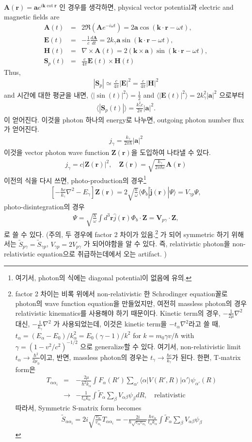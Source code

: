 \documentclass[11pt]{book}
\def\bm{\boldsymbol}
\def\vk{{\bm k}}
\def\vr{{\bm r}}
\def\la{\langle}
\def\ra{\rangle}
\newcommand{\bea}{\begin{eqnarray}}
\newcommand{\eea}{\end{eqnarray}}
\newcommand{\no}{\nonumber \\}
\begin{document}
${\bm A}(\vr)={\bm a}e^{i\vk\cot\vr}$ 인 경우를 생각하면, physical vector potential과 
electric and magnetic fields are
\bea 
{\bm A}(t)&=& 2\Re({\bm A}e^{-i\omega t})= 2{\bm a}\cos(\vk\cdot\vr-\omega t) ,\no 
{\bm E}(t)&=& -\frac{1}{c}\frac{d{\bm A}}{dt}
             = 2 k_\gamma {\bm a}\sin(\vk\cdot\vr-\omega t),\no 
{\bm H}(t)&=&\nabla\times{\bm A}(t)= 2(\vk\times{\bm a}) \sin(\vk\cdot\vr-\omega t),\no 
{\bm S}_p(t) &=& \frac{c}{4\pi}{\bm E}(t)\times{\bm H}(t)              
\eea 
Thus,
\bea 
|{\bm S}_p|\simeq \frac{c}{4\pi}|{\bm E}|^2=\frac{c}{4\pi}|{\bm H}|^2
\eea 
and 시간에 대한 평균을 내면,
$\la |\sin(t)|^2\ra =\frac{1}{2}$ and $\la |{\bm E}(t)|^2\ra = 2 k_\gamma^2 |{\bm a}|^2$
으로부터
\bea 
\la |{\bm S}_p(t)|\ra =\frac{k_\gamma^2 c}{2\pi}|{\bm a}|^2.
\eea 
이 얻어진다. 이것을 photon 하나의 energy로 나누면, outgoing photon number flux 가 얻어진다.
\bea 
j_\gamma =\frac{k_\gamma}{2\pi\hbar} |{\bm a}|^2
\eea 
이것을 vector photon wave function ${\bm Z}(\vr)$을 도입하여 나타낼 수 있다.
\bea 
j_\gamma = c|{\bm Z}(\vr)|^2,\quad {\bm Z}(\vr)=\sqrt{\frac{k_\gamma}{2\pi\hbar c}}{\bm A}(\vr)
\eea 
이전의 식을 다시 쓰면, photo-production의 경우\footnote{여기서,
photon의 식에는 diagonal potential이 없음에 유의. } 
\bea 
\left[-\frac{\hbar c}{k_\gamma}\nabla^2-E_\gamma\right]{\bm Z}(\vr)
 =2\sqrt{\frac{h}{\omega}}\la \Phi_b|\hat{\bm j}(\vr)|\Psi\ra
 =V_{\gamma p}\Psi ,  
\eea 
photo-disintegration의 경우
\bea 
[\hat{T}-V-E]\Psi= \sqrt{\frac{h}{\omega}}\int d^3\vr \hat{j}(\vr)\Phi_b\cdot {\bm Z}
      ={\bm V}_{p\gamma}\cdot {\bm Z},
\eea 
로 쓸 수 있다. (주의, 두 경우에 factor 2 차이가 있음.\footnote{
factor 2 차이는 비록 위에서 non-relativistic 한 Schrodinger equation꼴로 photon의 wave function equation을 만들었지만, 여전히 massless photon의 경우 relativistic kinematics를 사용해야 하기 때문이다. 
Kinetic term의 경우, $-\frac{1}{2\mu}\nabla^2$ 대신, $-\frac{1}{k_\gamma}\nabla^2$ 가 사용되었는데,
이것은 kinetic term을 $-t_\alpha\nabla^2$라고 쓸 때, 
$t_\alpha=(E_\alpha-E_0)/k_\alpha^2=E_0(\gamma-1)/k^2$ for $k=m_0\gamma v/\hbar $
with $\gamma=(1-v^2/c^2)^{-1/2}$ 으로 generalize할 수 있다. 여기서, non-relativistic limit $t_\alpha\to \frac{\hbar^2}{2\mu_0}$이고, 반면, massless photon의 경우는 
$t_\gamma\to \frac{\hbar c}{k_\gamma}$가 된다. 한편, T-matrix form은 
\bea 
T_{\alpha\alpha_i}&=&-\frac{2\mu}{\hbar^2 k_\alpha}\int F_\alpha(R')\sum_{\alpha'} \la \alpha|V(R',R)|\alpha'\ra \psi_{\alpha'}(R) \no 
 &\to& -\frac{1}{t_\alpha k_\alpha}\int \tilde{F}_\alpha\sum_{\beta} V_{\alpha\beta}\psi_{\beta }
  d R,\quad \mbox{relativistic} 
\eea 
따라서, 
Symmetric S-matrix form becomes
\bea 
\tilde{S}_{\alpha\alpha_i}
=2i\sqrt{\frac{v_\alpha}{v_{\alpha_i}}}T_{\alpha\alpha_i}
=-\frac{2i}{\hbar\sqrt{v_\alpha v_{\alpha_i}}}\frac{\hbar v_\alpha}{t_\alpha k_\alpha}
 \int \tilde{F}_\alpha\sum_{\beta} V_{\alpha\beta}\psi_{\beta }
\eea 
} 
가 되어 symmetric 하기 위해서는 $\tilde{S}_{p\gamma}=\tilde{S}_{\gamma p}$, $V_{\gamma p}=2 V_{p\gamma}$ 가 되어야함을 알 수 있다. 즉, relativistic photon을 
non-relativistic equation으로 취급하는데에서 오는 artifact.
)
\end{document}
